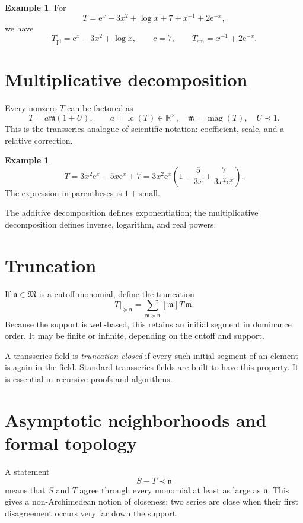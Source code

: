 \documentclass[11pt,oneside]{book}
\theoremstyle{definition}
\newtheorem{example}[theorem]{Example}
\theoremstyle{remark}
\newcommand{\R}{\mathbb{R}}
\newcommand{\M}{\mathfrak{M}}
\newcommand{\m}{\mathfrak{m}}
\newcommand{\n}{\mathfrak{n}}
\newcommand{\magop}{\operatorname{mag}}
\newcommand{\lc}{\operatorname{lc}}
\newcommand{\e}{\mathrm{e}}
\newcommand{\precdom}{\prec}
\newcommand{\succsimdom}{\succcurlyeq}
\begin{document}
\begin{example}
For
\[
  T=\e^x-3x^2+\log x+7+x^{-1}+2\e^{-x},
\]
we have
\[
  T_{\mathrm{pl}}=\e^x-3x^2+\log x,
  \qquad c=7,
  \qquad T_{\mathrm{sm}}=x^{-1}+2\e^{-x}.
\]
\end{example}

\section{Multiplicative decomposition}

Every nonzero $T$ can be factored as
\begin{equation}
  T=a\m(1+U),
  \qquad
  a=\lc(T)\in\R^\times,
  \quad \m=\magop(T),
  \quad U\precdom1.
  \label{eq:canonical-multiplicative-decomposition}
\end{equation}
This is the transseries analogue of scientific notation: coefficient, scale,
and a relative correction.

\begin{example}
\[
  T=3x^2\e^x-5x\e^x+7
  =3x^2\e^x
   \left(1-\frac{5}{3x}+\frac{7}{3x^2\e^x}\right).
\]
The expression in parentheses is $1+$small.
\end{example}

The additive decomposition defines exponentiation; the multiplicative
decomposition defines inverse, logarithm, and real powers.

\section{Truncation}

If $\n\in\M$ is a cutoff monomial, define the truncation
\[
  T\big|_{\succsimdom\n}
  =\sum_{\m\succsimdom\n}[\m]T\,\m.
\]
Because the support is well-based, this retains an initial segment in dominance
order. It may be finite or infinite, depending on the cutoff and support.

A transseries field is \emph{truncation closed} if every such initial segment of
an element is again in the field. Standard transseries fields are built to have
this property. It is essential in recursive proofs and algorithms.

\section{Asymptotic neighborhoods and formal topology}

A statement
\[
  S-T\precdom\n
\]
means that $S$ and $T$ agree through every monomial at least as large as $\n$.
This gives a non-Archimedean notion of closeness: two series are close when their
first disagreement occurs very far down the support.
\end{document}
